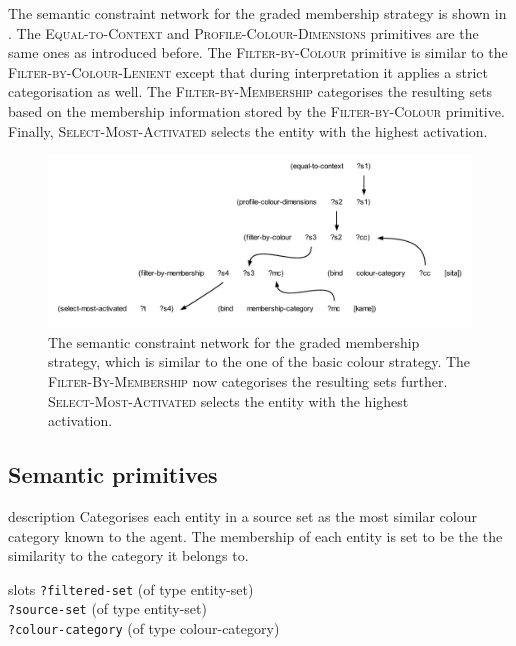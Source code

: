The semantic constraint network for the graded membership
  strategy is shown in . The
\textsc{Equal-to-Context} and \textsc{Profile-Colour-Dimensions}
primitives are the same ones as introduced before. The
\textsc{Filter-by-Colour} primitive is similar to the
\textsc{Filter-by-Colour-Lenient} except that during interpretation it
applies a strict categorisation as well. The
\textsc{Filter-by-Membership} categorises the resulting sets based on
the membership information stored by the \textsc{Filter-by-Colour}
primitive. Finally, \textsc{Select-Most-Activated} selects the entity
with the highest activation.

\begin{figure}[htbp]
  \centering
  \includegraphics[width=\textwidth]{./graded-membership/figures/semantic-program.pdf}
  \caption[The semantic constraint network for the graded membership
  strategy]{The semantic constraint network for the graded membership
    strategy, which is similar to the one of the basic colour
    strategy. The \textsc{Filter-By-Membership} now categorises the
    resulting sets further. \textsc{Select-Most-Activated} selects the
    entity with the highest activation.}
  \label{f:gms-semantic-program}
\end{figure}

\subsection{Semantic primitives}


\begin{explanation}{description}
  Categorises each entity in a source set as the most similar colour
  category known to the agent. The membership of each entity is set to
  be the the similarity to the category it belongs to.
\end{explanation}

\begin{explanation}{slots}
  \verb+?filtered-set+ (of type entity-set) \\
  \verb+?source-set+ (of type entity-set) \\
  \verb+?colour-category+ (of type colour-category)
\end{explanation}

